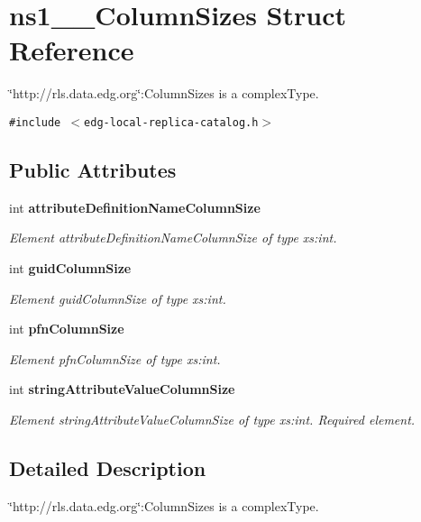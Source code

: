 \section{ns1\_\-\_\-Column\-Sizes Struct Reference}
\label{structns1____ColumnSizes}
\char`\"{}http://rls.data.edg.org\char`\"{}:Column\-Sizes is a complex\-Type.  


{\tt \#include $<$edg-local-replica-catalog.h$>$}

\subsection*{Public Attributes}
\begin{CompactItemize}
\item 
int \bf{attribute\-Definition\-Name\-Column\-Size}
\begin{CompactList}\small\item\em Element attribute\-Definition\-Name\-Column\-Size of type xs:int. \item\end{CompactList}\item 
int \bf{guid\-Column\-Size}
\begin{CompactList}\small\item\em Element guid\-Column\-Size of type xs:int. \item\end{CompactList}\item 
int \bf{pfn\-Column\-Size}
\begin{CompactList}\small\item\em Element pfn\-Column\-Size of type xs:int. \item\end{CompactList}\item 
int \bf{string\-Attribute\-Value\-Column\-Size}\label{structns1____ColumnSizes_62e50c944d159c0704422631fdd4e538}

\begin{CompactList}\small\item\em Element string\-Attribute\-Value\-Column\-Size of type xs:int. Required element. \item\end{CompactList}\end{CompactItemize}


\subsection{Detailed Description}
\char`\"{}http://rls.data.edg.org\char`\"{}:Column\-Sizes is a complex\-Type. 



